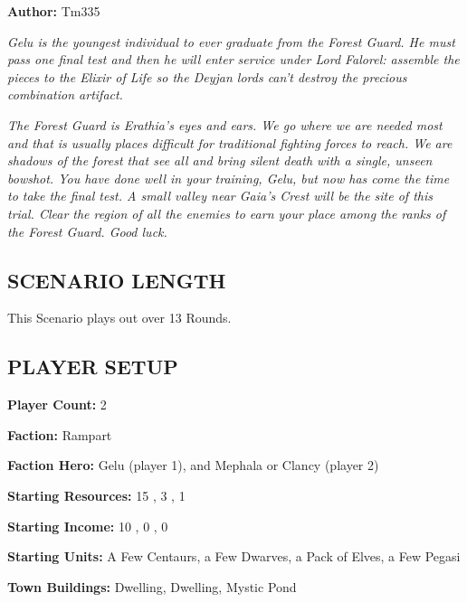 \cleardoublepage{}

\begin{multicols*}{2}

\textbf{Author:} Tm335

\textit{Gelu is the youngest individual to ever graduate from the Forest Guard.
  He must pass one final test and then he will enter service under Lord Falorel: assemble the pieces to the Elixir of Life so the Deyjan lords can't destroy the precious combination artifact.
}

\textit{The Forest Guard is Erathia’s eyes and ears.
  We go where we are needed most and that is usually places difficult for traditional fighting forces to reach.
  We are shadows of the forest that see all and bring silent death with a single, unseen bowshot.
  You have done well in your training, Gelu, but now has come the time to take the final test.
  A small valley near Gaia's Crest will be the site of this trial.
  Clear the region of all the enemies to earn your place among the ranks of the Forest Guard.
  Good luck.
}

\subsection*{\MakeUppercase{Scenario Length}}

This Scenario plays out over 13 Rounds.

\subsection*{\MakeUppercase{Player Setup}}

\textbf{Player Count:} 2

\textbf{Faction:} Rampart

\textbf{Faction Hero:} Gelu (player 1), and Mephala or Clancy (player 2)

\textbf{Starting Resources:} 15 , 3 , 1 

\textbf{Starting Income:} 10 , 0 , 0 

\textbf{Starting Units:} A Few Centaurs, a Few Dwarves, a Pack of Elves, a Few Pegasi

\textbf{Town Buildings:}  Dwelling,  Dwelling, Mystic Pond


\end{multicols*}
